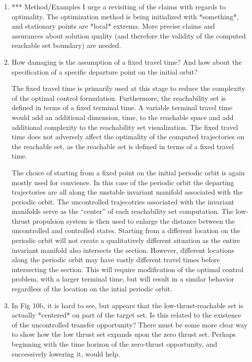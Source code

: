 \documentclass[11pt]{article}
\begin{document}
\begin{enumerate}
\item
    \begin{itshape}
*** Method/Examples
I urge a revisiting of the claims with regards to optimality.  The optimization method is being initialized with *something*, and stationary points are *local* extrema.  More precise claims and assurances about solution quality (and therefore the validity of the computed reachable set boundary) are needed.  
\end{itshape}

\item
    \begin{itshape}
How damaging is the assumption of a fixed travel time?  And how about the specification of a specific departure point on the initial orbit?
\end{itshape}

The fixed travel time is primarily used at this stage to reduce the complexity of the optimal control formulation. 
Furthermore, the reachability set is defined in terms of a fixed terminal time.
A variable terminal travel time would add an additional dimension, time, to the reachable space and add additional complexity to the reachability set visualization.
The fixed travel time does not adversely affect the optimality of the computed trajectories on the reachable set, as the reachable set is defined in terms of a fixed travel time. 

The choice of starting from a fixed point on the initial periodic orbit is again mostly used for convience. 
In this case of the periodic orbit the departing trajectories are all along the unstable invariant manifold associated with the periodic orbit. 
The uncontrolled trajecotries associated with the invariant manifolds serve as the ``center'' of each reachability set computation.
The low-thrust propulsion system is then used to enlarge the distance between the uncontrolled and controlled states. 
Starting from a different location on the periodic orbit will not create a qualitatively different situation as the entire invariant manifold also intersects the \Poincare section.
However, different locations along the periodic orbit may have vastly different travel times before intersecting the \Poincare section.
This will require modification of the optimal control problem, with a larger terminal time, but will result in a similar behavior regardless of the location on the intial periodic orbit.

\item
    \begin{itshape}
In Fig 10b, it is hard to see, but appears that the low-thrust-reachable set is actually *centered* on part of the target set.  Is this related to the existence of the uncontrolled transfer opportunity?  There must be some more clear way to show how the low thrust set expands upon the zero thrust set.  Perhaps beginning with the time horizon of the zero-thrust opportunity, and successively lowering it, would help.  
\end{itshape}


\end{enumerate}
\end{document}
